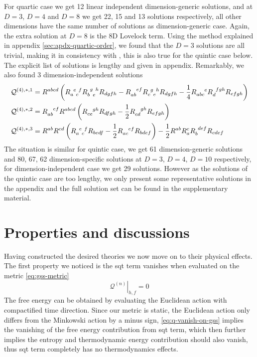 \documentclass[a4paper,11pt]{article}
\begin{document}
For quartic case we get 12 linear independent dimension-generic solutions, and at $D = 3$, $D = 4$ and $D = 8$ we get 22, 15 and 13 solutions respectively, all other dimensions have the same number of solutions as dimension-generic case. Again, the extra solution at $D = 8$ is the 8D Lovelock term. Using the method explained in appendix \ref{sec:apdx-quartic-order}, we found that the $D = 3$ solutions are all trivial, making it in consistency with \cite{aspects-of-3d-higher-grav}, this is also true for the quintic case below. The explicit list of solutions is lengthy and given in appendix. Remarkably, we also found 3 dimension-independent solutions
\begin{align}
    \mathcal Q^{(4), *, 1} & = R^{abcd}\left(R\indices{_a^e_c^f}R\indices{_b^g_e^h}R_{dgfh}
    - R\indices{_a_b^e^f}R\indices{_c^g_e^h}R_{dgfh}
    - \frac14 R\indices{_a_b_c^e}R\indices{_d^f^g^h}R_{efgh}\right)\\
    \mathcal Q^{(4), *, 2} & = R\indices{_a_b^e^f}R^{abcd}\left(R\indices{_c_e^g^h}R_{dfgh} - \frac12 R\indices{_c_d^g^h}R_{efgh}\right) \\
    \mathcal Q^{(4), *, 3} & = R^{ab}R^{cd}\left(R\indices{_a^e_c^f}R_{bedf} - \frac12 R\indices{_a_c^e^f}R_{bdef}\right) - \frac12 R^{ab}R_a^c R\indices{_b^d^e^f}R_{cdef}
\end{align}
The situation is similar for quintic case, we get 61 dimension-generic solutions and 80, 67, 62 dimension-specific solutions at $D = 3$, $D = 4$, $D = 10$ respectively, for dimension-independent case we get 29 solutions. However as the solutions of the quintic case are too lengthy, we only present some representative solutions in the appendix and the full solution set can be found in the supplementary material.

\section{Properties and discussions}
\label{sec:props}
Having constructed the desired theories we now move on to their physical effects. The first property we noticed is the \ac{sqt} term vanishes when evaluated on the metric \eqref{eq:gss-metric}
\begin{equation}\label{eq:q-vanish-on-gss}
    \left.\mathcal Q^{(n)}\right|_{h,f} = 0
\end{equation}
The free energy can be obtained by evaluating the Euclidean action with compactified time direction. Since our metric is static, the Euclidean action only differs from the Minkowski action by a minus sign, \eqref{eq:q-vanish-on-gss} implies the vanishing of the free energy contribution from \ac{sqt} term, which then further implies the entropy and thermodynamic energy contribution should also vanish, thus \ac{sqt} term completely has no thermodynamics effects.
\end{document}

